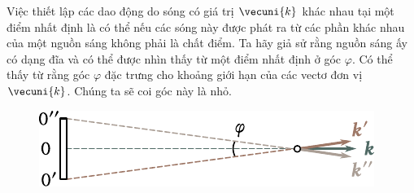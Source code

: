 Việc thiết lập các dao động do sóng có giá trị $\vecuni{k}$ khác nhau tại một điểm nhất định là có thể nếu các sóng này được phát ra từ các phần khác nhau của một nguồn sáng không phải là chất điểm.
Ta hãy giả sử rằng nguồn sáng ấy có dạng đĩa và có thể được nhìn thấy từ một điểm nhất định ở góc $\varphi$.
Có thể thấy từ  rằng góc $\varphi$ đặc trưng cho khoảng giới hạn của các vectơ đơn vị $\vecuni{k}$.
Chúng ta sẽ coi góc này là nhỏ.

\begin{figure}[!htb]
	\begin{center}
		\includegraphics[scale=1]{figures/ch_17/fig_17_6.pdf}
		\caption[]{}
		\label{fig:17_6}
	\end{center}
	\vspace{-0.9cm}
\end{figure}

